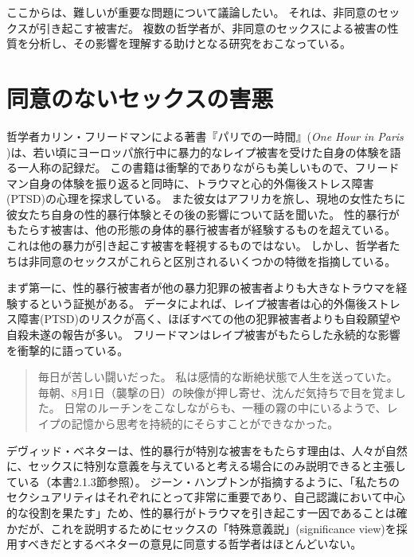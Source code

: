 \documentclass[paper=a4,book,openany]{jlreq}
\newcommand{\ig}[1]{}           %
\begin{document}
ここからは、難しいが重要な問題について議論したい。
それは、非同意のセックスが引き起こす被害だ。
複数の哲学者が、非同意のセックスによる被害の性質を分析し、その影響を理解する助けとなる研究をおこなっている。

\section{同意のないセックスの害悪}

哲学者カリン・フリードマン\ig{Karyn L. Freedman}による著書『パリでの一時間』(\emph{One Hour in Paris} \citep{freedman14:_one_hour_paris})は、若い頃にヨーロッパ旅行中に暴力的なレイプ被害を受けた自身の体験を語る一人称の記録だ。
この書籍は衝撃的でありながらも美しいもので、フリードマン自身の体験を振り返ると同時に、トラウマと心的外傷後ストレス障害(PTSD)の心理を探求している。
また彼女はアフリカを旅し、現地の女性たちに彼女たち自身の性的暴行体験とその後の影響について話を聞いた。
性的暴行がもたらす被害は、他の形態の身体的暴行被害者が経験するものを超えている。
これは他の暴力が引き起こす被害を軽視するものではない。
しかし、哲学者たちは非同意のセックスがこれらと区別されるいくつかの特徴を指摘している。

まず第一に、性的暴行被害者が他の暴力犯罪の被害者よりも大きなトラウマを経験するという証拠がある。
データによれば、レイプ被害者は心的外傷後ストレス障害(PTSD)のリスクが高く、ほぼすべての他の犯罪被害者よりも自殺願望や自殺未遂の報告が多い\citep[p.104]{wertheimer03:_consen_sexual_relat}。
フリードマン\ig{Karyn L. Freedman}はレイプ被害がもたらした永続的な影響を衝撃的に語っている。

\begin{quote}
毎日が苦しい闘いだった。
私は感情的な断絶状態で人生を送っていた。
毎朝、8月1日（襲撃の日）の映像が押し寄せ、沈んだ気持ちで目を覚ました。
日常のルーチンをこなしながらも、一種の霧の中にいるようで、レイプの記憶から思考を持続的にそらすことができなかった。
\citep{freedman14:_one_hour_paris}
\end{quote}

デヴィッド・ベネターは、性的暴行が特別な被害をもたらす理由は、人々が自然に、セックスに特別な意義を与えていると考える場合にのみ説明できると主張している（本書2.1.3節参照）。
ジーン・ハンプトン\ig{Jean Hampton}が指摘するように、「私たちのセクシュアリティはそれぞれにとって非常に重要であり、自己認識において中心的な役割を果たす」ため、性的暴行がトラウマを引き起こす一因であることは確かだが、これを説明するためにセックスの「特殊意義説」(significance view)を採用すべきだとするベネター\ig{Benatar}の意見に同意する哲学者はほとんどいない\citep[p.151]{hampton99:_defin_wrong_and_defin_rape}。
\end{document}
